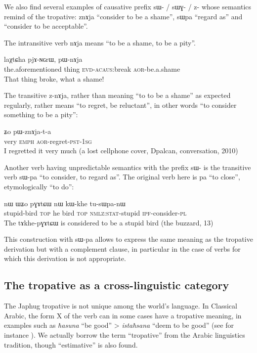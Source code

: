 \documentclass[oldfontcommands,oneside,a4paper,11pt]{article}
\newcommand{\ipa}[1]{{\phon #1}} %
\newcommand{\acaus}{\textsc{acaus}}
\newcommand{\aor}{\textsc{aor}}
\newcommand{\emphat}{\textsc{emph}}
\newcommand{\evd}{\textsc{evd}}
\newcommand{\ipf}{\textsc{ipf}}
\newcommand{\nmlz}{\textsc{nmlz}}
\newcommand{\pl}{\textsc{pl}}
\newcommand{\pst}{\textsc{pst}}
\newcommand{\sg}{\textsc{sg}}
\newcommand{\stat}{\textsc{stat}}
\newcommand{\topic}{\textsc{top}}
\begin{document}
  
 
We also find several examples of causative prefix \ipa{sɯ-} / \ipa{sɯɣ-} / \ipa{z-} whose semantics remind of the tropative: \ipa{znɤja} ``consider to be a shame'', \ipa{sɯpa} ``regard as'' and  ``consider to be acceptable''.

The intransitive verb \ipa{nɤja} means ``to be a shame, to be a pity''.
  \begin{exe}
\ex
\gll \ipa{iɕqha} 	\ipa{laχtɕha} 	\ipa{pjɤ-ɴɢrɯ,} 	\ipa{pɯ-nɤja} \\
the.aforementioned thing \evd{}-\acaus{}:break \aor{}-be.a.shame \\
  \glt  That thing broke, what a shame!
   \end{exe}

   The transitive \ipa{z-nɤja}, rather than meaning ``to to be a shame'' as expected regularly, rather means ``to regret, be reluctant'', in other words ``to consider something to be a pity'':
   
     \begin{exe}
\ex 
\gll \ipa{wuma} 	\ipa{ʑo} 	\ipa{pɯ-znɤja-t-a}  \\
very \emphat{} \aor{}-regret-\pst{}-1\sg{} \\
  \glt  I regretted it very much (a lost cellphone cover, Dpalcan, conversation, 2010)
   \end{exe}
Another verb having unpredictable semantics with the prefix \ipa{sɯ-} is the transitive verb \ipa{sɯ-pa} ``to consider, to regard as''. The original verb here is \ipa{pa} ``to close'', etymologically ``to do'':

     \begin{exe}
\ex 
\gll \ipa{tɤkhe-pɣɤtɕɯ} 	\ipa{nɯ} 	\ipa{ɯʑo} 	\ipa{pɣɤtɕɯ} 	\ipa{nɯ} 	\ipa{kɯ-khe} 	\ipa{tu-sɯpa-nɯ} \\
stupid-bird \topic{} he bird \topic{} \nmlz{}:\stat{}-stupid \ipf{}-consider-\pl{} \\
 \glt The \ipa{tɤkhe-pɣɤtɕɯ} is considered to be a stupid bird (the buzzard, 13)
   \end{exe}
 
 This construction with  \ipa{sɯ-pa} allows to express the same meaning as the tropative derivation but with a complement clause, in particular in the case of verbs for which this derivation is not appropriate.
 
 
 \subsection{The tropative as a cross-linguistic category}
   The Japhug tropative is not unique among the world's language. In Classical Arabic, the form X of the verb can in some cases have a tropative meaning, in examples such as \textit{ħasuna} ``be good'' > \textit{istaħsana} ``deem to be good'' (see for instance \citet{larcher96}). We actually borrow the term ``tropative'' from the Arabic linguistics tradition, though ``estimative'' is also found.
   
\end{document}
